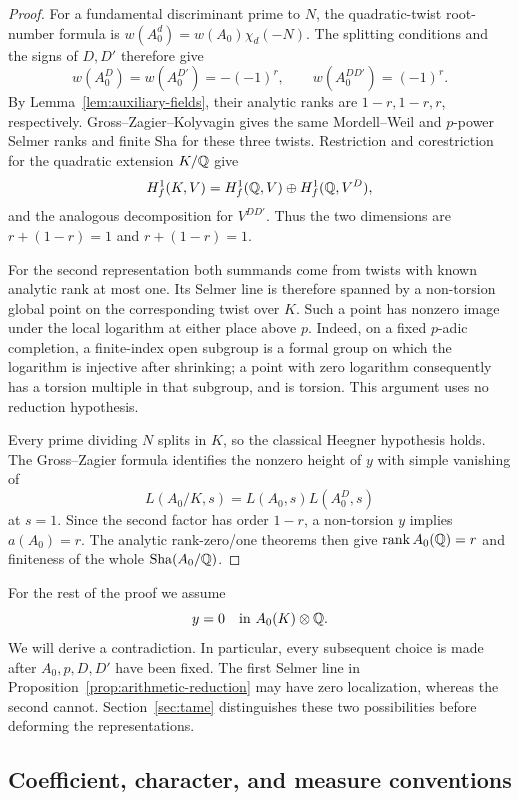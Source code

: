 \begin{proof}
For a fundamental discriminant prime to $N$, the quadratic-twist
root-number formula is $w(A_0^d)=w(A_0)\chi_d(-N)$.
The splitting conditions and the signs of $D,D'$ therefore give
\[
 w(A_0^D)=w(A_0^{D'})=-(-1)^r,
 \qquad w(A_0^{DD'})=(-1)^r.
\]
By Lemma~\ref{lem:auxiliary-fields}, their analytic ranks are
$1-r,1-r,r$, respectively. Gross--Zagier--Kolyvagin gives the same
Mordell--Weil and $p$-power Selmer ranks and finite Sha for these three
twists. Restriction and corestriction for the quadratic extension
$K/\mathbb Q$ give
\[
 H^1_f(K,V)
  =H^1_f(\mathbb Q,V)\oplus H^1_f(\mathbb Q,V^D),
\]
and the analogous decomposition for $V^{DD'}$. Thus the two dimensions
are $r+(1-r)=1$ and $r+(1-r)=1$.

For the second representation both summands come from twists with
known analytic rank at most one. Its Selmer line is therefore spanned
by a non-torsion global point on the corresponding twist over $K$.
Such a point has nonzero image under the local logarithm at either
place above $p$. Indeed, on a fixed $p$-adic completion, a finite-index
open subgroup is a formal group on which the logarithm is injective
after shrinking; a point with zero logarithm consequently has a
torsion multiple in that subgroup, and is torsion. This argument uses
no reduction hypothesis.

Every prime dividing $N$ splits in $K$, so the classical Heegner
hypothesis holds. The Gross--Zagier formula identifies the nonzero
height of $y$ with simple vanishing of
\[
 L(A_0/K,s)=L(A_0,s)L(A_0^D,s)
\]
at $s=1$. Since the second factor has order $1-r$, a non-torsion $y$
implies $a(A_0)=r$. The analytic rank-zero/one theorems then give
$\operatorname{rank} A_0(\mathbb Q)=r$ and finiteness of the whole $\operatorname{Sha}(A_0/\mathbb Q)$.
\end{proof}

For the rest of the proof we assume
\begin{equation}\label{eq:torsion-assumption}
 y=0\quad\text{in }A_0(K)\otimes\mathbb Q.
\end{equation}
We will derive a contradiction. In particular, every subsequent
choice is made after $A_0,p,D,D'$ have been fixed.
The first Selmer line in Proposition~\ref{prop:arithmetic-reduction}
may have zero localization, whereas the second cannot.
Section~\ref{sec:tame} distinguishes these two possibilities before
deforming the representations.

\subsection{Coefficient, character, and measure conventions}
\label{sec:conventions}

